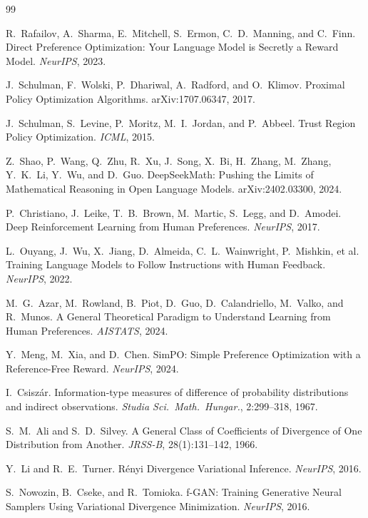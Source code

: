 \documentclass[11pt]{article}
\theoremstyle{definition}
\theoremstyle{remark}
\begin{document}
\begin{thebibliography}{99}\setlength{\itemsep}{0pt}

R.~Rafailov, A.~Sharma, E.~Mitchell, S.~Ermon, C.~D.~Manning, and C.~Finn.
Direct Preference Optimization: Your Language Model is Secretly a Reward Model.
\emph{NeurIPS}, 2023.

J.~Schulman, F.~Wolski, P.~Dhariwal, A.~Radford, and O.~Klimov.
Proximal Policy Optimization Algorithms.
arXiv:1707.06347, 2017.

J.~Schulman, S.~Levine, P.~Moritz, M.~I.~Jordan, and P.~Abbeel.
Trust Region Policy Optimization.
\emph{ICML}, 2015.

Z.~Shao, P.~Wang, Q.~Zhu, R.~Xu, J.~Song, X.~Bi, H.~Zhang, M.~Zhang, Y.~K.~Li, Y.~Wu, and D.~Guo.
DeepSeekMath: Pushing the Limits of Mathematical Reasoning in Open Language Models.
arXiv:2402.03300, 2024.

P.~Christiano, J.~Leike, T.~B.~Brown, M.~Martic, S.~Legg, and D.~Amodei.
Deep Reinforcement Learning from Human Preferences.
\emph{NeurIPS}, 2017.

L.~Ouyang, J.~Wu, X.~Jiang, D.~Almeida, C.~L.~Wainwright, P.~Mishkin, et al.
Training Language Models to Follow Instructions with Human Feedback.
\emph{NeurIPS}, 2022.

M.~G.~Azar, M.~Rowland, B.~Piot, D.~Guo, D.~Calandriello, M.~Valko, and R.~Munos.
A General Theoretical Paradigm to Understand Learning from Human Preferences.
\emph{AISTATS}, 2024.

Y.~Meng, M.~Xia, and D.~Chen.
SimPO: Simple Preference Optimization with a Reference-Free Reward.
\emph{NeurIPS}, 2024.

I.~Csisz\'ar.
Information-type measures of difference of probability distributions and indirect observations.
\emph{Studia Sci.\ Math.\ Hungar.}, 2:299--318, 1967.

S.~M.~Ali and S.~D.~Silvey.
A General Class of Coefficients of Divergence of One Distribution from Another.
\emph{JRSS-B}, 28(1):131--142, 1966.

Y.~Li and R.~E.~Turner.
R\'enyi Divergence Variational Inference.
\emph{NeurIPS}, 2016.

S.~Nowozin, B.~Cseke, and R.~Tomioka.
f-GAN: Training Generative Neural Samplers Using Variational Divergence Minimization.
\emph{NeurIPS}, 2016.


\end{thebibliography}
\end{document}
